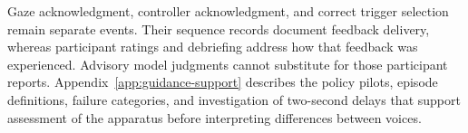 Gaze acknowledgment, controller acknowledgment, and correct trigger selection remain separate events. Their sequence records document feedback delivery, whereas participant ratings and debriefing address how that feedback was experienced. Advisory model judgments cannot substitute for those participant reports. Appendix~\ref{app:guidance-support} describes the policy pilots, episode definitions, failure categories, and investigation of two-second delays that support assessment of the apparatus before interpreting differences between voices.
